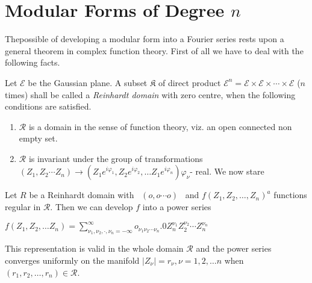 \chapter{Modular Forms of Degree \texorpdfstring{$n$}{n}} %

The\pageoriginale possible of developing a modular form into a Fourier
series rests 
upon a general theorem in complex function theory. First of all we
have to deal with the following facts. 

Let $\mathscr{E}$ be the Gaussian plane. A subset $\mathfrak{K}$ of
direct product $\mathscr{E}^n=\mathscr{E} \times \mathscr{E} \times
\cdots \times \mathscr{E}$ ($n$ times) shall be called a
\textit{Reinhardt domain} with zero centre, when the following
conditions are satisfied. 
\begin{enumerate}[1)]
\item $\mathcal{R}$ is a domain in the sense of function theory,
  viz. an open   connected non empty set.  

\item $\mathcal{R}$ is invariant under the group of transformations
  $(Z_1,Z_2   \cdots Z_n) \to (Z_1 e^{i \varphi_1}, Z_2 e^{i
  \varphi_2}, \ldots   Z_1e^{i \varphi _n}) \varphi _ \nu$- real. We
  now stare  
\end{enumerate}

\begin{lem}\label{chap5:lem9} %
Let $R$ be a Reinhardt domain with \, $(o,o \cdots o)$ \, and \break
  $f(Z_1,Z_2 ,\ldots ,Z_n)^a$ functions regular in $\mathcal{R}$. Then we can
  develop $f$ into a power series 

$f(Z_1,Z_2 ,\ldots Z_n)= \sum ^\infty _{\nu _1,\nu _2, \cdot ,\nu
  _n=-\infty}o_{\nu _1 \nu _2 \cdots \nu _n}.0 Z_n^{\nu _1} Z_2^{\nu
  _2}\cdots Z_n^{\nu _n}$ 

This representation is valid in the whole domain $\mathcal{R}$ and the
  power series converges uniformly on the manifold $|Z_\nu|=r_\nu, \nu
  =1,2, \ldots n$ when $(r_1,r_2, \ldots ,r_n) \in \mathcal{R}$. 
\end{lem}

